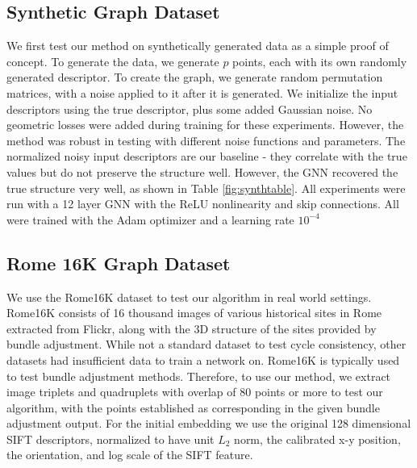 \documentclass[10pt,twocolumn,letterpaper]{article}
\begin{document}
\subsection{Synthetic Graph Dataset}
We first test our method on synthetically generated data as a simple proof of concept.
To generate the data, we generate $p$ points, each with its own randomly generated descriptor.
To create the graph, we generate random permutation matrices, with a noise applied to it after it is generated.
We initialize the input descriptors using the true descriptor, plus some added Gaussian noise.
No geometric losses were added during training for these experiments.
However, the method was robust in testing with different noise functions and parameters.
The normalized noisy input descriptors are our baseline - they correlate with the true values but do not preserve the structure well.
However, the GNN recovered the true structure very well, as shown in Table \ref{fig:synthtable}.
All experiments were run with a 12 layer GNN with the ReLU nonlinearity and skip connections.
All were trained with the Adam optimizer \cite{kingma2014adam} and a learning rate $10^{-4}$


\subsection{Rome 16K Graph Dataset}
We  use the Rome16K dataset \cite{li2010location} to test our algorithm in real world settings.
Rome16K consists of 16 thousand images of various historical sites in Rome extracted from Flickr, along with the 3D structure of the sites provided by bundle adjustment.
While not a standard dataset to test cycle consistency, other datasets had insufficient data to train a network on.
Rome16K is typically used to test bundle adjustment methods.
Therefore, to use our method, we extract image triplets and quadruplets with overlap of 80 points or more to test our algorithm, with the points established as corresponding in the given bundle adjustment output.
For the initial embedding we use the original 128 dimensional SIFT descriptors, normalized to have unit $L_2$ norm, the calibrated x-y position, the orientation, and log scale of the SIFT feature.
\end{document}
